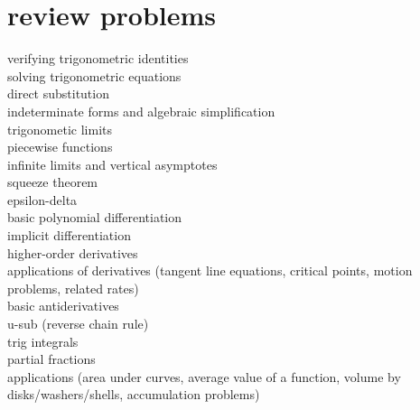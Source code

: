 \documentclass{article}
\begin{document}
\newpage
\section*{review problems}	

verifying trigonometric identities\\
solving trigonometric equations\\

direct substitution\\
indeterminate forms and algebraic simplification\\
trigonometic limits\\
piecewise functions\\
infinite limits and vertical asymptotes\\

squeeze theorem\\
epsilon-delta\\

basic polynomial differentiation\\
implicit differentiation\\
higher-order derivatives\\
applications of derivatives (tangent line equations, critical points, motion problems, related rates)\\

basic antiderivatives\\
u-sub (reverse chain rule)\\
trig integrals\\

partial fractions\\
applications (area under curves, average value of a function, volume by disks/washers/shells, accumulation problems)\\
\end{document}

